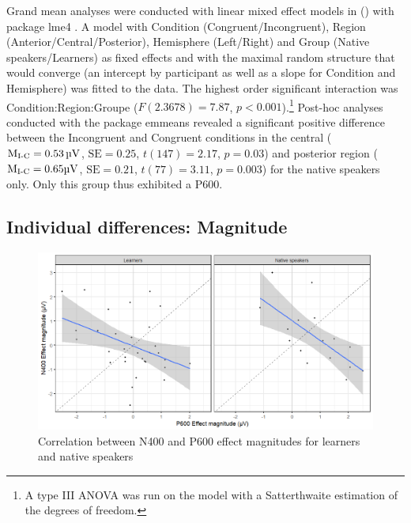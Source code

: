 \documentclass[output=paper,colorlinks,citecolor=brown,modfonts,nonflat]{../langscibook}
\begin{document}
Grand mean analyses were conducted with linear mixed effect models in (\citealt{RCoreTeam2019}) with package lme4 \citep{BatesEtAl2015}. A model with Condition (Congruent\slash Incongruent), Region (Anterior\slash Central\slash Posterior), Hemisphere (Left\slash Right) and Group (Native speakers\slash Learners) as fixed effects and with the maximal random structure that would converge (an intercept by participant as well as a slope for Condition and Hemisphere) was fitted to the data. The highest order significant interaction was Condition:Region:Groupe ($F(2.3678) = 7.87$, $p < 0.001$).\footnote{A type III ANOVA was run on the model with a Satterthwaite estimation of the degrees of freedom.} Post-hoc analyses conducted with the package emmeans \citep{Lenth2019} revealed a significant positive difference between the Incongruent and Congruent conditions in the central ($\text{M\textsubscript{I-C}} = 0.53 \text{\,µV}$, $\text{SE} = 0.25$, $t(147) = 2.17$, $p = 0.03$) and posterior region ($\text{M\textsubscript{I-C}} = 0.65 \text{µV}$, $\text{SE} = 0.21$, $t(77) = 3.11$, $p = 0.003$) for the native speakers only. Only this group thus exhibited a P600.

\subsection{Individual differences: Magnitude}

\begin{figure}
\includegraphics[width=\textwidth]{figures/pelissier-img001.png}
\caption{Correlation between N400 and P600 effect magnitudes for learners and native speakers\label{fig:pelissier:1}}
\end{figure}
\end{document}

